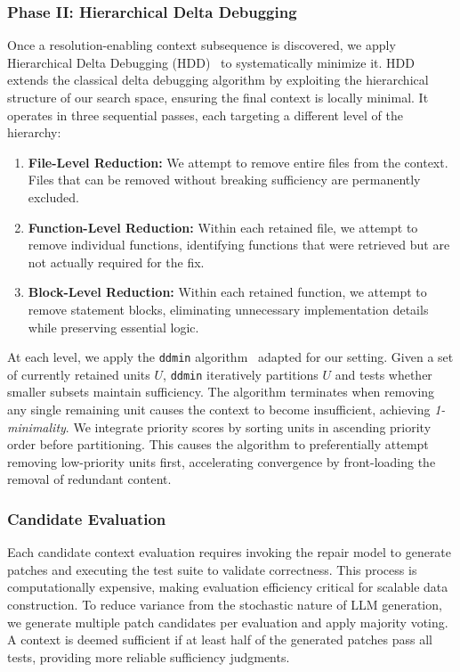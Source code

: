 \documentclass[sigconf,nonacm]{acmart}
\begin{document}

\subsubsection{Phase II: Hierarchical Delta Debugging}
Once a resolution-enabling context subsequence is discovered, we apply Hierarchical Delta Debugging (HDD)~\cite{misherghi2006hdd} to systematically minimize it. HDD extends the classical delta debugging algorithm by exploiting the hierarchical structure of our search space, ensuring the final context is locally minimal. It operates in three sequential passes, each targeting a different level of the hierarchy:
\begin{enumerate}
    \item \textbf{File-Level Reduction:} We attempt to remove entire files from the context. Files that can be removed without breaking sufficiency are permanently excluded.
    \item \textbf{Function-Level Reduction:} Within each retained file, we attempt to remove individual functions, identifying functions that were retrieved but are not actually required for the fix.
    \item \textbf{Block-Level Reduction:} Within each retained function, we attempt to remove statement blocks, eliminating unnecessary implementation details while preserving essential logic.
\end{enumerate}

At each level, we apply the \texttt{ddmin} algorithm~\cite{zeller2002simplifying} adapted for our setting. Given a set of currently retained units $U$, \texttt{ddmin} iteratively partitions $U$ and tests whether smaller subsets maintain sufficiency. The algorithm terminates when removing any single remaining unit causes the context to become insufficient, achieving \textit{1-minimality}. We integrate priority scores by sorting units in ascending priority order before partitioning. This causes the algorithm to preferentially attempt removing low-priority units first, accelerating convergence by front-loading the removal of redundant content.

\subsubsection{Candidate Evaluation}

Each candidate context evaluation requires invoking the repair model to generate patches and executing the test suite to validate correctness. This process is computationally expensive, making evaluation efficiency critical for scalable data construction. To reduce variance from the stochastic nature of LLM generation, we generate multiple patch candidates per evaluation and apply majority voting. A context is deemed sufficient if at least half of the generated patches pass all tests, providing more reliable sufficiency judgments.
\end{document}

